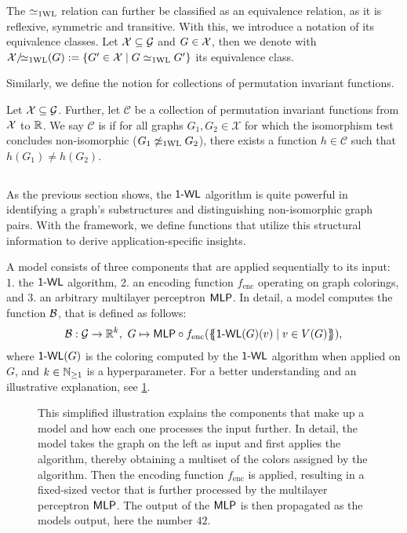 The $\simeq_{\text{1WL}}$ relation can further be classified as an equivalence relation, as it is reflexive, symmetric and transitive. With this, we introduce a notation of its equivalence classes. Let $\mathcal{X} \subseteq \mathcal{G}$ and $G \in \mathcal{X}$, then we denote with $\mathcal{X}/\!{\simeq_{\text{1WL}}}(G): = \{ G' \in \mathcal{X} \mid G \simeq_{\text{1WL}} G' \}$ its equivalence class.

Similarly, we define the notion \wldisc for collections of permutation invariant functions. 

\begin{definition}[\wldisc]
    Let $\mathcal{X} \subseteq \mathcal{G}$. Further, let $\mathcal{C}$ be a collection of permutation invariant functions from $\mathcal{X}$ to $\mathbb{R}$. We say $\mathcal{C}$ is \wldisc if for all graphs $G_1, G_2 \in \mathcal{X}$ for which the \wl isomorphism test concludes non-isomorphic ($G_1 \not\simeq_{\text{1WL}} G_2$), there exists a function $h \in \mathcal{C}$ such that $h(G_1) \neq h(G_2)$.
\end{definition}

\subsection{\wlnn}\label{sec:definition_wlnn}
As the previous section shows, the $\textsf{1-WL}$ algorithm is quite powerful in identifying a graph's substructures and distinguishing non-isomorphic graph pairs. With the \wlnn framework, we define functions that utilize this structural information to derive application-specific insights.

\begin{definition}[\wlnn]
    A \wlnn model consists of three components that are applied sequentially to its input: 1. the $\textsf{1-WL}$ algorithm, 2. an encoding function $f_\text{enc}$ operating on graph colorings, and 3. an arbitrary multilayer perceptron $\textsf{MLP}$. In detail, a \wlnn model computes the function $\mathcal{B}$, that is defined as follows:
    \begin{align*}
        \mathcal{B}: \mathcal{G} \rightarrow \mathbb{R}^k, \ G \mapsto \textsf{MLP} \circ f_{\text{enc}}(\{\!\!\{ \textsf{1-WL}(G)(v) \mid v \in V(G) \}\!\!\}),
    \end{align*}
    where $\textsf{1-WL}(G)$ is the coloring computed by the $\textsf{1-WL}$ algorithm when applied on $G$, and $k \in \mathbb{N}_{\geq 1}$ is a hyperparameter. For a better understanding and an illustrative explanation, see \cref{fig:wlnn}.
\end{definition}

\begin{figure}[!htb]
    \centering
    
    \caption{This simplified illustration explains the components that make up a \wlnn model and how each one processes the input further. In detail, the model takes the graph on the left as input and first applies the \wl algorithm, thereby obtaining a multiset of the colors assigned by the algorithm. Then the encoding function $f_\text{enc}$ is applied, resulting in a fixed-sized vector that is further processed by the multilayer perceptron $\textsf{MLP}$. The output of the $\textsf{MLP}$ is then propagated as the \wlnn models output, here the number $42$.}
    \label{fig:wlnn}
\end{figure}

